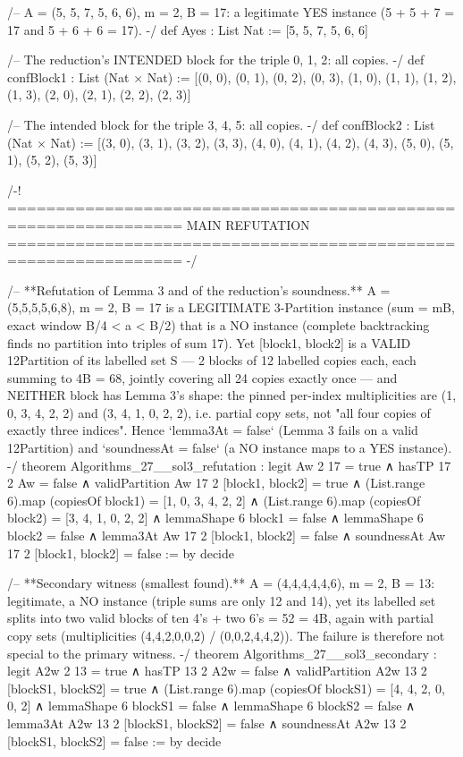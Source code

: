 \documentclass[11pt]{article}
\begin{document}
\begin{Vlean}
/-- A = (5, 5, 7, 5, 6, 6), m = 2, B = 17: a legitimate YES instance
(5 + 5 + 7 = 17 and 5 + 6 + 6 = 17). -/
def Ayes : List Nat := [5, 5, 7, 5, 6, 6]

/-- The reduction's INTENDED block for the triple {0, 1, 2}: all copies. -/
def confBlock1 : List (Nat × Nat) :=
  [(0, 0), (0, 1), (0, 2), (0, 3),
   (1, 0), (1, 1), (1, 2), (1, 3),
   (2, 0), (2, 1), (2, 2), (2, 3)]

/-- The intended block for the triple {3, 4, 5}: all copies. -/
def confBlock2 : List (Nat × Nat) :=
  [(3, 0), (3, 1), (3, 2), (3, 3),
   (4, 0), (4, 1), (4, 2), (4, 3),
   (5, 0), (5, 1), (5, 2), (5, 3)]

/-! ================================================================
    MAIN REFUTATION
    ================================================================ -/

/-- **Refutation of Lemma 3 and of the reduction's soundness.**
A = (5,5,5,5,6,8), m = 2, B = 17 is a LEGITIMATE 3-Partition instance
(sum = mB, exact window B/4 < a < B/2) that is a NO instance (complete
backtracking finds no partition into triples of sum 17).  Yet
[block1, block2] is a VALID 12Partition of its labelled set S — 2 blocks
of 12 labelled copies each, each summing to 4B = 68, jointly covering all
24 copies exactly once — and NEITHER block has Lemma 3's shape: the pinned
per-index multiplicities are (1, 0, 3, 4, 2, 2) and (3, 4, 1, 0, 2, 2),
i.e. partial copy sets, not "all four copies of exactly three indices".
Hence `lemma3At = false` (Lemma 3 fails on a valid 12Partition) and
`soundnessAt = false` (a NO instance maps to a YES instance). -/
theorem Algorithms_27__sol3_refutation :
    legit Aw 2 17 = true
  ∧ hasTP 17 2 Aw = false
  ∧ validPartition Aw 17 2 [block1, block2] = true
  ∧ (List.range 6).map (copiesOf block1) = [1, 0, 3, 4, 2, 2]
  ∧ (List.range 6).map (copiesOf block2) = [3, 4, 1, 0, 2, 2]
  ∧ lemmaShape 6 block1 = false
  ∧ lemmaShape 6 block2 = false
  ∧ lemma3At Aw 17 2 [block1, block2] = false
  ∧ soundnessAt Aw 17 2 [block1, block2] = false := by
  decide

/-- **Secondary witness (smallest found).**  A = (4,4,4,4,4,6), m = 2,
B = 13: legitimate, a NO instance (triple sums are only 12 and 14), yet its
labelled set splits into two valid blocks of ten 4's + two 6's = 52 = 4B,
again with partial copy sets (multiplicities (4,4,2,0,0,2) / (0,0,2,4,4,2)).
The failure is therefore not special to the primary witness. -/
theorem Algorithms_27__sol3_secondary :
    legit A2w 2 13 = true
  ∧ hasTP 13 2 A2w = false
  ∧ validPartition A2w 13 2 [blockS1, blockS2] = true
  ∧ (List.range 6).map (copiesOf blockS1) = [4, 4, 2, 0, 0, 2]
  ∧ lemmaShape 6 blockS1 = false
  ∧ lemmaShape 6 blockS2 = false
  ∧ lemma3At A2w 13 2 [blockS1, blockS2] = false
  ∧ soundnessAt A2w 13 2 [blockS1, blockS2] = false := by
  decide


\end{Vlean}
\end{document}
